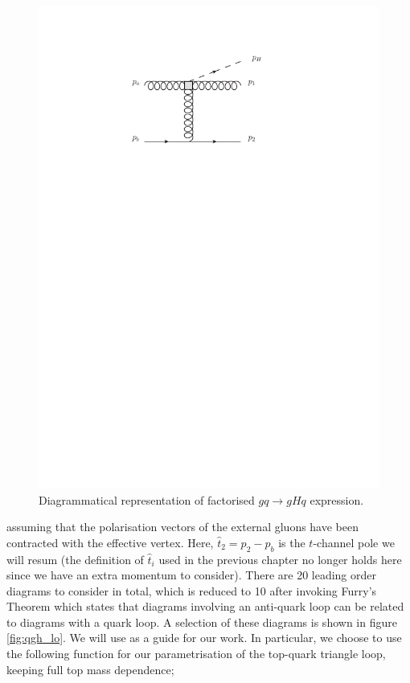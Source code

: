 \begin{figure}[t]
\centering
\includegraphics{Images/qgh_impact_factor.pdf}
\caption{Diagrammatical representation of factorised $gq \to gHq$ expression.}
\label{fig:gqH_imp}
\end{figure}

assuming that the polarisation vectors of the external gluons have been contracted with the effective vertex. Here, $\hat{t}_2 = p_2 - p_b$ is the $t$-channel pole we will resum (the definition of $\hat{t}_i$ used in the previous chapter no longer holds here since we have an extra momentum to consider). There are 20 leading order diagrams to consider in total, which is reduced to 10 after invoking Furry's Theorem which states that diagrams involving an anti-quark loop can be related to diagrams with a quark loop. A selection of these diagrams is shown in figure \ref{fig:qgh_lo}. We will use \cite{DelDuca2001} as a guide for our work. In particular, we choose to use the following function for our parametrisation of the top-quark triangle loop, keeping full top mass dependence;

